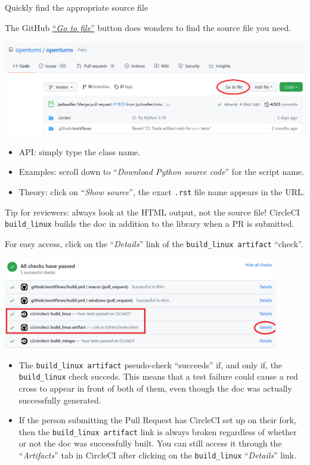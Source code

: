 \documentclass[8pt, handout]{beamer}
\begin{document}
\begin{frame}{Quickly find the appropriate source file}

The GitHub \href{https://github.com/openturns/openturns/find/master}{``\alert{\emph{Go to file}}''} button does wonders to find the source file you need.

\includegraphics[width=\textwidth]{Github_gotofile}

\begin{itemize}
    \item API: simply type the class name.
    \item Examples: scroll down to ``\alert{\emph{Download Python source code}}'' for the script name.
    \item Theory: click on ``\alert{\emph{Show source}}'', the exact \texttt{.rst} file name appears in the URL.
\end{itemize}

\end{frame}


\begin{frame}{Tip for reviewers: always look at the HTML output, not the source file!}
CircleCI \texttt{build\_linux} builds the doc in addition to the library when a PR is submitted.

For easy access, click on the ``\alert{\emph{Details}}'' link of the \texttt{build\_linux artifact} ``check''.

\includegraphics[width=0.9\textwidth]{Github_checks}

\begin{itemize}
    \item The \texttt{build\_linux artifact} pseudo-check ``succeeds'' if, and only if, the \texttt{build\_linux} check succeds.
    This means that a test failure could cause a red cross to appear in front of both of them, even though the doc was actually successfully generated.
    \item If the person submitting the Pull Request has CircleCI set up on their fork, then the \texttt{build\_linux artifact} link is always broken regardless of whether or not the doc was successfully built. You can still access it through the ``\alert{\emph{Artifacts}}'' tab in CircleCI after clicking on the \texttt{build\_linux} ``\alert{\emph{Details}}'' link.
\end{itemize}
\end{frame}
\end{document}
